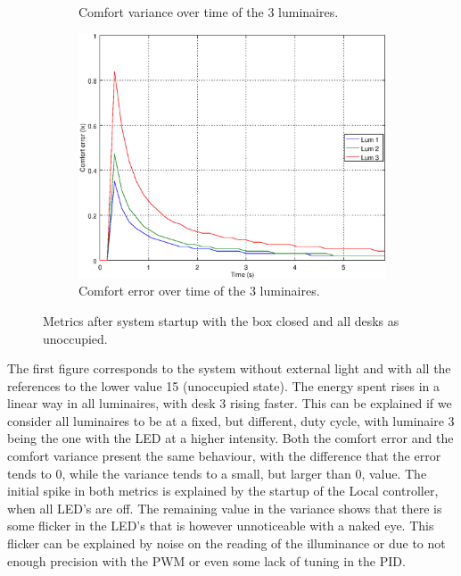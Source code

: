 \begin{figure}[ht]
\begin{subfigure}[t]{0.32\textwidth}
    \caption{Comfort variance over time of the 3 luminaires.}
    \label{fig:f_closed_o000}
    \end{subfigure}
    \begin{subfigure}[t]{0.32\textwidth}
    \centering
    \includegraphics[width=.95\textwidth]{img/n_closed_o000}
    \caption{Comfort error over time of the 3 luminaires.}
    \label{fig:n_closed_o000}
    \end{subfigure}
    \caption{Metrics after system startup with the box closed and all desks as unoccupied.}
    \label{fig:closed_o000}
\end{figure}

The first figure corresponds to the system without external light and with all the references to the lower value 15 (unoccupied state). The energy spent rises in a linear way in all luminaires, with desk 3 rising faster. This can be explained if we consider all luminaires to be at a fixed, but different, duty cycle, with luminaire 3 being the one with the LED at a higher intensity. Both the comfort error and the comfort variance present the same behaviour, with the difference that the error tends to 0, while the variance tends to a small, but larger than 0, value. The initial spike in both metrics is explained by the startup of the Local controller, when all LED's are off. The remaining value in the variance shows that there is some flicker in the LED's that is however unnoticeable with a naked eye. This flicker can be explained by noise on the reading of the illuminance or due to not enough precision with the PWM or even some lack of tuning in the PID.

